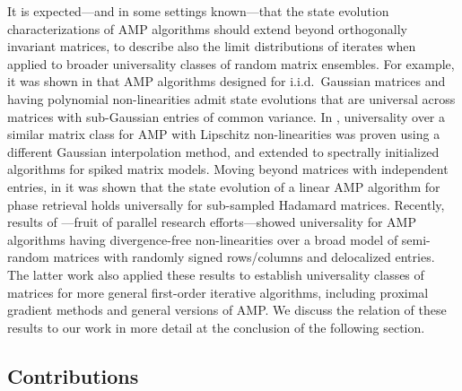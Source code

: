 \documentclass[10pt,reqno]{amsart}
\begin{document}
It is expected---and in some settings known---that the state evolution
characterizations of AMP algorithms should extend beyond orthogonally 
invariant matrices, to describe also the limit distributions of iterates
when applied to broader universality classes of random matrix ensembles. 
For example, it was shown in \cite{bayati2015universality} that AMP algorithms
designed for i.i.d.\ Gaussian matrices and having
polynomial non-linearities admit state evolutions that are universal across
matrices with sub-Gaussian entries of common variance.
In \cite{chen2021universality}, universality over a similar matrix class
for AMP with Lipschitz non-linearities
was proven using a different Gaussian interpolation method, and extended
to spectrally initialized algorithms for spiked matrix models.
Moving beyond matrices with independent entries,
in \cite{dudeja2020universality} it was shown that the state evolution of a linear 
AMP algorithm for phase retrieval holds universally for
sub-sampled Hadamard matrices. Recently, results of
\cite{dudeja2022universality,dudeja2022spectral}---fruit of parallel research
efforts---showed universality for AMP
algorithms having divergence-free non-linearities over a broad
model of semi-random matrices with randomly signed rows/columns and delocalized
entries. The latter work \cite{dudeja2022spectral} also applied these results
to establish universality classes of matrices for more general first-order
iterative algorithms, including proximal gradient methods and general versions
of AMP. We discuss the relation of these results to our work in
more detail at the conclusion of the following section.

\subsection{Contributions}
\end{document}
